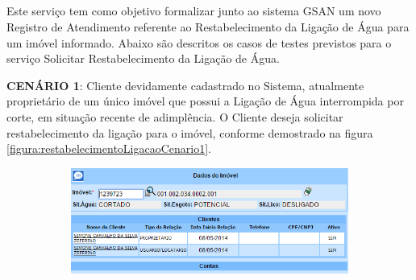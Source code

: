 \subsection{\fontsize{12}{1} }
Este serviço tem como objetivo formalizar junto ao sistema GSAN um novo Registro de Atendimento referente ao Restabelecimento da Ligação de Água para um imóvel informado.
Abaixo são descritos os casos de testes previstos para o serviço Solicitar Restabelecimento da Ligação de Água.
\begin{flushleft}
	\begin{description}
		\item \textbf{CENÁRIO 1}: Cliente devidamente cadastrado no Sistema, atualmente proprietário de um único imóvel que possui a Ligação de Água interrompida por corte, em situação recente de adimplência. O Cliente deseja solicitar restabelecimento da ligação para o imóvel, conforme demostrado na figura \ref{figura:restabelecimentoLigacaoCenario1}.
		\begin{figure}[H]
			\centering
			\caption{\textbf{Restabelecimento da Ligação de Água - Cenário de Teste 1}}
			\label{figura:restabelecimentoLigacaoCenario1}
			\begin{subfigure}[H]{\textwidth}
				\centering
				\includegraphics{figuras/cenarios/restabelecimento/cenario_1.PNG}
			\end{subfigure}
		\end{figure}
	\end{description}
	

\end{flushleft}
